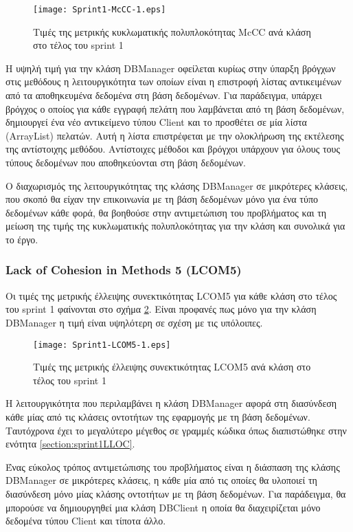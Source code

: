 \begin{figure}
\centering
\texttt{[image: Sprint1-McCC-1.eps]}
\caption{Τιμές της μετρικής κυκλωματικής πολυπλοκότητας McCC ανά κλάση στο τέλος του sprint 1}
\label{fig:sprint1McCC}
\end{figure}

H υψηλή τιμή για την κλάση DBManager οφείλεται κυρίως στην
ύπαρξη βρόγχων στις μεθόδους η λειτουργικότητα των οποίων είναι η
επιστροφή λίστας αντικειμένων από τα αποθηκευμένα δεδομένα στη βάση
δεδομένων. Για παράδειγμα, υπάρχει βρόγχος ο οποίος για κάθε εγγραφή
πελάτη που λαμβάνεται από τη βάση δεδομένων, δημιουργεί ένα νέο
αντικείμενο τύπου Client και το προσθέτει σε μία λίστα (ArrayList)
πελατών. Αυτή η λίστα επιστρέφεται με την ολοκλήρωση της εκτέλεσης της
αντίστοιχης μεθόδου. Αντίστοιχες μέθοδοι και βρόγχοι υπάρχουν για όλους
τους τύπους δεδομένων που αποθηκεύονται στη βάση δεδομένων.

Ο διαχωρισμός της λειτουργικότητας της κλάσης DBManager σε μικρότερες
κλάσεις, που σκοπό θα είχαν την επικοινωνία με τη βάση δεδομένων μόνο
για ένα τύπο δεδομένων κάθε φορά, θα βοηθούσε στην αντιμετώπιση του
προβλήματος και τη μείωση της τιμής της κυκλωματικής πολυπλοκότητας για
την κλάση και συνολικά για το έργο.

\subsubsection{Lack of Cohesion in Methods 5 (LCOM5)}
\label{section:sprint1LCOM5}

Οι τιμές της μετρικής έλλειψης συνεκτικότητας LCOM5 για κάθε κλάση στο
τέλος του sprint 1 φαίνονται στο σχήμα \ref{fig:sprint1LCOM5}. Είναι
προφανές πως μόνο για την κλάση DBManager η τιμή είναι υψηλότερη σε
σχέση με τις υπόλοιπες.

\begin{figure}
\centering
\texttt{[image: Sprint1-LCOM5-1.eps]}
\caption{Τιμές της μετρικής έλλειψης συνεκτικότητας LCOM5 ανά κλάση στο τέλος του sprint 1}
\label{fig:sprint1LCOM5}
\end{figure}

Η λειτουργικότητα που περιλαμβάνει η κλάση DBManager αφορά στη
διασύνδεση κάθε μίας από τις κλάσεις οντοτήτων της εφαρμογής με τη βάση
δεδομένων. Ταυτόχρονα έχει το μεγαλύτερο μέγεθος
σε γραμμές κώδικα όπως διαπιστώθηκε στην ενότητα
\ref{section:sprint1LLOC}.

Ένας εύκολος τρόπος αντιμετώπισης του προβλήματος είναι η διάσπαση της
κλάσης DBManager σε μικρότερες κλάσεις, η κάθε μία από τις οποίες
θα υλοποιεί τη διασύνδεση μόνο μίας κλάσης οντοτήτων με τη βάση
δεδομένων. Για παράδειγμα, θα μπορούσε να δημιουργηθεί μια κλάση
DBClient η οποία θα διαχειρίζεται μόνο δεδομένα τύπου Client και τίποτα
άλλο.

